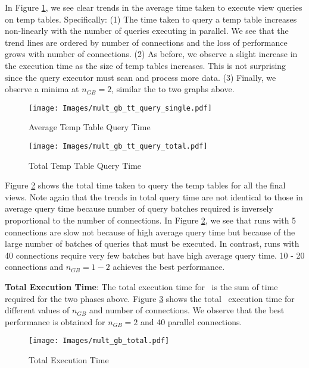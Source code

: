 In Figure \ref{fig:avg_tt_query_time}, we see clear trends in  the average time
taken to execute view queries on temp tables. Specifically: (1) The time taken
to query a temp table increases non-linearly with the number of queries
executing in parallel. We see that the trend lines are ordered by number of
connections and the loss of performance grows with number of connections. (2) As
before, we observe a slight increase in the execution time as the size of temp
tables increases. This is not surprising since the query executor must scan and
process more data. (3) Finally, we observe a minima at $n_{GB}=2$, similar the to
two graphs above.


\begin{figure}[h]
  \centering
    \texttt{[image: Images/mult\_gb\_tt\_query\_single.pdf]}
  \caption{Average Temp Table Query Time}
  \label{fig:avg_tt_query_time}
\end{figure}

\begin{figure}[h]
  \centering
    \texttt{[image: Images/mult\_gb\_tt\_query\_total.pdf]}
     \caption{Total Temp Table Query Time} 
       \label{fig:total_tt_query_time}
\end{figure}

Figure \ref{fig:total_tt_query_time} shows the total time taken to query the
temp tables for all the final views. Note again that the trends in total query
time are not identical to those in average query time because number of query
batches required is inversely proportional to the number of connections.
In Figure \ref{fig:total_tt_query_time}, we see that runs with 5 connections are
slow not because of high average query time but because of the large number of
batches of queries that must be executed. In contrast, runs with 40 connections
require very few batches but have high average query time. 10 - 20 connections
and $n_{GB}=1-2$ achieves the best performance.



{\bf Total Execution Time}: The total execution time for \VizRecDB\ is the sum of
time required for the two phases above. Figure \ref{fig:total_time} shows the
total \VizRecDB\ execution time for different values of $n_{GB}$ and number of
connections. We observe that the best performance is obtained for
$n_{GB}=2$ and 40 parallel connections.

\begin{figure}[h]
     \centering
    \texttt{[image: Images/mult\_gb\_total.pdf]}
    \caption{Total Execution Time}
  \label{fig:total_time}
\end{figure}

